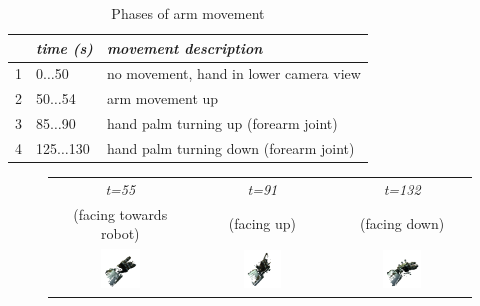 \begin{table}
\centering
\begin{tabular}{|c|l|l|}
\hline
 & \emph{time (s)} & \emph{movement description} \\
\hline
1 & 0$\dots$50 & no movement, hand in lower camera view \\
\hline
2 & 50$\dots$54 & arm movement up \\
\hline
3 & 85$\dots$90 & hand palm turning up (forearm joint) \\
\hline
4 & 125$\dots$130 & hand palm turning down (forearm joint) \\
\hline
\end{tabular}
\caption{Phases of arm movement}
\label{tab:vic_arm_movement_phases}
\end{table}

\begin{figure}
\centering
\begin{tabular}{c:c:c}
\textit{t=55} & \textit{t=91} & \textit{t=132} \\
(facing towards robot) & (facing up) & (facing down)\\
\includegraphics[width=0.3\textwidth]{images/eval_vicon/sequence/arm_movement/obs_55.png} & \includegraphics[width=0.3\textwidth]{images/eval_vicon/sequence/arm_movement/obs_91.png} & \includegraphics[width=0.3\textwidth]{images/eval_vicon/sequence/arm_movement/obs_132.png} \\

\end{tabular}
\end{figure}
